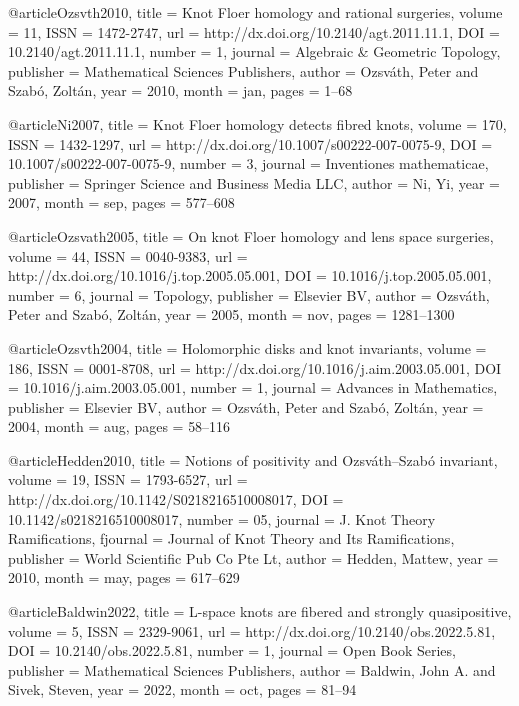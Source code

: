 @article{Ozsvth2010,
  title = {Knot Floer homology and rational surgeries},
  volume = {11},
  ISSN = {1472-2747},
  url = {http://dx.doi.org/10.2140/agt.2011.11.1},
  DOI = {10.2140/agt.2011.11.1},
  number = {1},
  journal = {Algebraic \& Geometric Topology},
  publisher = {Mathematical Sciences Publishers},
  author = {Ozsváth,  Peter and Szabó,  Zoltán},
  year = {2010},
  month = jan,
  pages = {1--68}
}

@article{Ni2007,
  title = {Knot {Floer} homology detects fibred knots},
  volume = {170},
  ISSN = {1432-1297},
  url = {http://dx.doi.org/10.1007/s00222-007-0075-9},
  DOI = {10.1007/s00222-007-0075-9},
  number = {3},
  journal = {Inventiones mathematicae},
  publisher = {Springer Science and Business Media LLC},
  author = {Ni,  Yi},
  year = {2007},
  month = sep,
  pages = {577--608}
}

@article{Ozsvath2005,
  title = {On knot {Floer} homology and lens space surgeries},
  volume = {44},
  ISSN = {0040-9383},
  url = {http://dx.doi.org/10.1016/j.top.2005.05.001},
  DOI = {10.1016/j.top.2005.05.001},
  number = {6},
  journal = {Topology},
  publisher = {Elsevier BV},
  author = {Ozsváth,  Peter and Szabó,  Zoltán},
  year = {2005},
  month = nov,
  pages = {1281--1300}
}

@article{Ozsvth2004,
  title = {Holomorphic disks and knot invariants},
  volume = {186},
  ISSN = {0001-8708},
  url = {http://dx.doi.org/10.1016/j.aim.2003.05.001},
  DOI = {10.1016/j.aim.2003.05.001},
  number = {1},
  journal = {Advances in Mathematics},
  publisher = {Elsevier BV},
  author = {Ozsváth,  Peter and Szabó,  Zoltán},
  year = {2004},
  month = aug,
  pages = {58--116}
}

@article{Hedden2010,
  title = {Notions of positivity and {Ozsv\'ath--Szab\'o} invariant},
  volume = {19},
  ISSN = {1793-6527},
  url = {http://dx.doi.org/10.1142/S0218216510008017},
  DOI = {10.1142/s0218216510008017},
  number = {05},
  journal = {J. Knot Theory Ramifications},
  fjournal = {Journal of Knot Theory and Its Ramifications},
  publisher = {World Scientific Pub Co Pte Lt},
  author = {Hedden,  Mattew},
  year = {2010},
  month = may,
  pages = {617--629}
}

@article{Baldwin2022,
  title = {L-space knots are fibered and strongly quasipositive},
  volume = {5},
  ISSN = {2329-9061},
  url = {http://dx.doi.org/10.2140/obs.2022.5.81},
  DOI = {10.2140/obs.2022.5.81},
  number = {1},
  journal = {Open Book Series},
  publisher = {Mathematical Sciences Publishers},
  author = {Baldwin,  John A. and Sivek,  Steven},
  year = {2022},
  month = oct,
  pages = {81--94}
}

